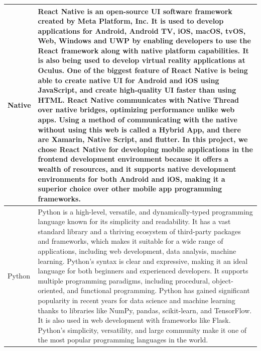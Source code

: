 \documentclass[conference]{IEEEtran}
\begin{document}
\begin{table}[htbp]
\begin{tabular}{| p{1.2cm}|p{6.8cm} |}
             Native & React Native is an open-source UI software framework created by Meta Platform, Inc. It is used to develop applications for Android, Android TV, iOS, macOS, tvOS, Web, Windows and UWP by enabling developers to use the React framework along with native platform capabilities. It is also being used to develop virtual reality applications at Oculus. One of the biggest feature of React Native is being able to create native UI for Android and iOS using JavaScript, and create high-quality UI faster than using HTML.
             React Native communicates with Native Thread over native bridges, optimizing performance unlike web apps. Using a method of communicating with the native without using this web is called a Hybrid App, and there are Xamarin, Native Script, and flutter.
             In this project, we chose React Native for developing mobile applications in the frontend development environment because it offers a wealth of resources, and it supports native development environments for both Android and iOS, making it a superior choice over other mobile app programming frameworks.\\
             \hline
             Python & Python is a high-level, versatile, and dynamically-typed programming language known for its simplicity and readability. It has a vast standard library and a thriving ecosystem of third-party packages and frameworks, which makes it suitable for a wide range of applications, including web development, data analysis, machine learning. Python's syntax is clear and expressive, making it an ideal language for both beginners and experienced developers. It supports multiple programming paradigms, including procedural, object-oriented, and functional programming. Python has gained significant popularity in recent years for data science and machine learning thanks to libraries like NumPy, pandas, scikit-learn, and TensorFlow. It is also used in web development with frameworks like Flask. Python's simplicity, versatility, and large community make it one of the most popular programming languages in the world.\\
             \hline
        \end{tabular}
    \end{table}
    
\end{document}
